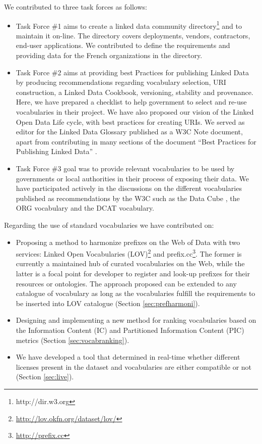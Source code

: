 \documentclass[a4paper,11pt,twoside]{report}
\begin{document}
We contributed to three task forces as follows:
\begin{itemize}
\item Task Force \#1 aims to create a linked data community directory\footnote{http://dir.w3.org} and to maintain it on-line. The directory covers deployments, vendors, contractors, end-user applications. We contributed to define the requirements and providing data for the French organizations in the directory.

\item Task Force \#2 aims at providing best Practices for publishing Linked Data by producing recommendations regarding vocabulary selection, URI construction, a Linked Data Cookbook, versioning, stability and provenance. Here, we have prepared a checklist to help government to select and re-use vocabularies in their project. We have also proposed our vision of the Linked Open Data Life cycle, with best practices for creating URIs. We served as editor for the Linked Data Glossary \cite{glossairegld} published as a W3C Note document, apart from contributing in many sections of the document ``Best Practices for Publishing Linked Data'' \cite{bpgld}.

\item Task Force \#3 goal was to provide relevant vocabularies to be used by governments or local authorities in their process of exposing their data. We have participated actively in the discussions on the different vocabularies published as recommendations by the W3C such as the Data Cube \cite{dcube}, the ORG vocabulary \cite{org} and the DCAT \cite{dcat} vocabulary.
\end{itemize}

Regarding the use of standard vocabularies we have contributed on: 
\begin{itemize}

\item  Proposing a method to harmonize prefixes on the Web of Data  with two services: Linked Open Vocabularies (LOV)\footnote{\url{http://lov.okfn.org/dataset/lov/}} and prefix.cc\footnote{\url{http://prefix.cc}}. The former is currently a maintained hub of curated vocabularies on the Web, while the latter is a focal point for developer to register and look-up prefixes for their resources or ontologies. The approach proposed can be extended to any catalogue of vocabulary as long as the vocabularies fulfill the requirements to be inserted into LOV catalogue (Section \ref{sec:prefharmoni}). 

\item  Designing and implementing a new method for ranking vocabularies based on the Information Content (IC) and Partitioned Information Content (PIC) metrics (Section \ref{sec:vocabranking}).

\item We have developed a tool that determined in real-time whether different licenses present in the dataset and vocabularies are either compatible or not (Section \ref{sec:live}). 
\end{itemize}
\end{document}
